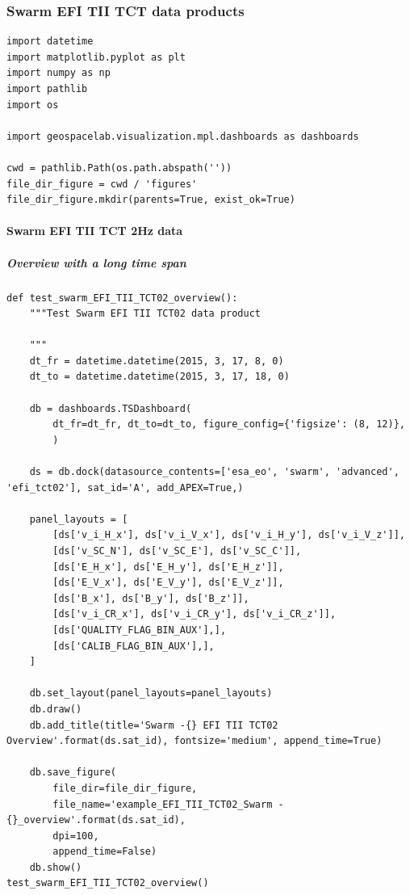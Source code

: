 \subsubsection{Swarm EFI TII TCT data products}

\begin{verbatim}
import datetime
import matplotlib.pyplot as plt
import numpy as np
import pathlib
import os

import geospacelab.visualization.mpl.dashboards as dashboards

cwd = pathlib.Path(os.path.abspath(''))
file_dir_figure = cwd / 'figures'
file_dir_figure.mkdir(parents=True, exist_ok=True)
\end{verbatim}

\paragraph{Swarm EFI TII TCT 2Hz data}

\subparagraph{Overview with a long time span}

\begin{verbatim}
def test_swarm_EFI_TII_TCT02_overview():
    """Test Swarm EFI TII TCT02 data product
    
    """
    dt_fr = datetime.datetime(2015, 3, 17, 8, 0)
    dt_to = datetime.datetime(2015, 3, 17, 18, 0)

    db = dashboards.TSDashboard(
        dt_fr=dt_fr, dt_to=dt_to, figure_config={'figsize': (8, 12)},
        )

    ds = db.dock(datasource_contents=['esa_eo', 'swarm', 'advanced', 'efi_tct02'], sat_id='A', add_APEX=True,)

    panel_layouts = [
        [ds['v_i_H_x'], ds['v_i_V_x'], ds['v_i_H_y'], ds['v_i_V_z']],
        [ds['v_SC_N'], ds['v_SC_E'], ds['v_SC_C']],
        [ds['E_H_x'], ds['E_H_y'], ds['E_H_z']],
        [ds['E_V_x'], ds['E_V_y'], ds['E_V_z']],
        [ds['B_x'], ds['B_y'], ds['B_z']],
        [ds['v_i_CR_x'], ds['v_i_CR_y'], ds['v_i_CR_z']],
        [ds['QUALITY_FLAG_BIN_AUX'],],
        [ds['CALIB_FLAG_BIN_AUX'],],
    ]

    db.set_layout(panel_layouts=panel_layouts)
    db.draw()
    db.add_title(title='Swarm -{} EFI TII TCT02 Overview'.format(ds.sat_id), fontsize='medium', append_time=True)

    db.save_figure(
        file_dir=file_dir_figure, 
        file_name='example_EFI_TII_TCT02_Swarm -{}_overview'.format(ds.sat_id), 
        dpi=100, 
        append_time=False)
    db.show()
test_swarm_EFI_TII_TCT02_overview()
\end{verbatim}

